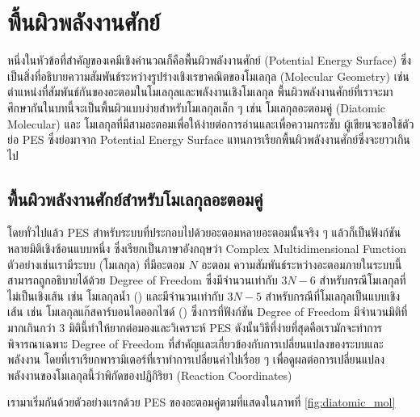 \section{พื้นผิวพลังงานศักย์}
\label{sec:pes}

หนึ่งในหัวข้อที่สำคัญของเคมีเชิงคำนวณก็คือพื้นผิวพลังงานศักย์ (Potential Energy Surface) ซึ่งเป็นสิ่งที่อธิบายความสัมพันธ์ระหว่างรูปร่างเชิงเรขาคณิตของโมเลกุล (Molecular Geometry) เช่น ตำแหน่งที่สัมพันธ์กันของอะตอมในโมเลกุลและพลังงานเชิงโมเลกุล พื้นผิวพลังงานศักย์ที่เราจะมาศึกษากันในบทนี้จะเป็นพื้นผิวแบบง่ายสำหรับโมเลกุลเล็ก ๆ เช่น โมเลกุลอะตอมคู่ (Diatomic Molecular) และ โมเลกุลที่มีสามอะตอมเพื่อให้ง่ายต่อการอ่านและเพื่อความกระชับ ผู้เขียนจะขอใช้ตัวย่อ PES ซึ่งย่อมาจาก Potential Energy Surface แทนการเรียกพื้นผิวพลังงานศักย์ซึ่งจะยาวเกินไป

\subsection{พื้นผิวพลังงานศักย์สำหรับโมเลกุลอะตอมคู่}
\label{ssec:pes_di_atomic}

โดยทั่วไปแล้ว PES สำหรับระบบที่ประกอบไปด้วยอะตอมหลายอะตอมนั้นจริง ๆ แล้วก็เป็นฟังก์ชันหลายมิติเชิงซ้อนแบบหนึ่ง ซึ่งเรียกเป็นภาษาอังกฤษว่า Complex Multidimensional Function ตัวอย่างเช่นเรามีระบบ (โมเลกุล) ที่มีอะตอม $N$ อะตอม ความสัมพันธ์ระหว่างอะตอมภายในระบบนี้สามารถถูกอธิบายได้ด้วย Degree of Freedom ซึ่งมีจำนวนเท่ากับ $3N-6$ สำหรับกรณีโมเลกุลที่ไม่เป็นเชิงเส้น เช่น โมเลกุลน้ำ () และมีจำนวนเท่ากับ $3N-5$ สำหรับกรณีที่โมเลกุลเป็นแบบเชิงเส้น เช่น โมเลกุลแก๊สคาร์บอนไดออกไซด์ () ซึ่งการที่ฟังก์ชัน Degree of Freedom มีจำนวนมิติที่มากเกินกว่า 3 มิตินี้ทำให้ยากต่อมองและวิเคราะห์ PES ดังนั้นวิธีที่ง่ายที่สุดคือเรามักจะทำการพิจารณาเฉพาะ Degree of Freedom ที่สำคัญและเกี่ยวข้องกับการเปลี่ยนแปลงของระบบและพลังงาน โดยที่เราเรียกพารามิเตอร์ที่เราทำการเปลี่ยนค่าไปเรื่อย ๆ เพื่อดูผลต่อการเปลี่ยนแปลงพลังงานของโมเลกุลนี้ว่าพิกัดของปฏิกิริยา (Reaction Coordinates)

เรามาเริ่มกันด้วยตัวอย่างแรกด้วย PES ของอะตอมคู่ตามที่แสดงในภาพที่ \ref{fig:diatomic_mol}

